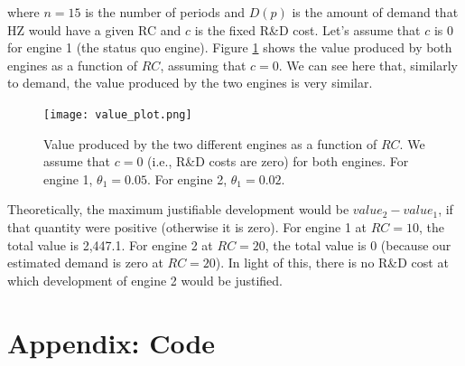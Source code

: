 \documentclass[paper=a4, fontsize=11pt]{scrartcl} %
\numberwithin{equation}{section} %
\numberwithin{figure}{section} %
\numberwithin{table}{section} %
\newcommand{\mylisting}[2][]{%
}
\begin{document}
\begin{itemize}
\begin{itemize}
\noindent where $n=15$ is the number of periods and $D(p)$ is the amount of demand that HZ would have a given RC and $c$ is the fixed R\&D cost. Let's assume that $c$ is 0 for engine 1 (the status quo engine). Figure \ref{fig:value_plot} shows the value produced by both engines as a function of $RC$, assuming that $c = 0$. We can see here that, similarly to demand, the value produced by the two engines is very similar.

\begin{figure}[ht!]
\centering
	\texttt{[image: value\_plot.png]}
\caption{Value produced by the two different engines as a function of $RC$. We assume that $c = 0$ (i.e., R\&D costs are zero) for both engines. For engine 1, $\theta_1 = 0.05$. For engine 2, $\theta_1 = 0.02$.}
\label{fig:value_plot}
\end{figure}

Theoretically, the maximum justifiable development would be $value_2 - value_1$, if that quantity were positive (otherwise it is zero). For engine 1 at $RC = 10$, the total value is 2,447.1. For engine 2 at $RC = 20$, the total value is 0 (because our estimated demand is zero at $RC=20$). In light of this, there is no R\&D cost at which development of engine 2 would be justified. 

\end{itemize}

\end{itemize}

\newpage
\section*{Appendix: Code}

\mylisting[language=R]{./rust.R}
\end{document}
